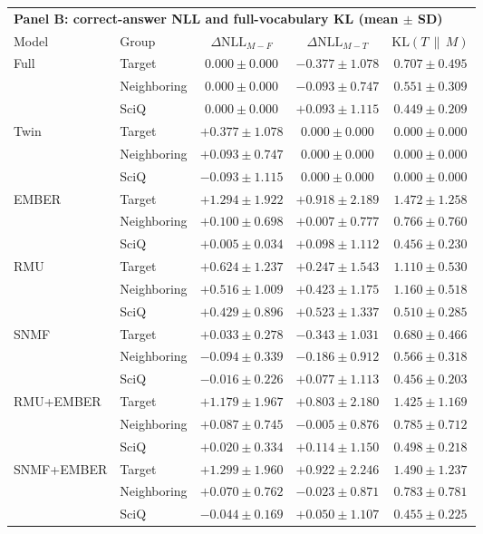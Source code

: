 \begin{table}[t]
  \vspace{1em}
  \begin{tabular}{llccc}
    \toprule
    \multicolumn{5}{l}{\textbf{Panel B: correct-answer NLL and full-vocabulary KL (mean $\pm$ SD)}} \\
    \cmidrule(lr){1-5}
    Model & Group & $\Delta\mathrm{NLL}_{M-F}$ & $\Delta\mathrm{NLL}_{M-T}$ & $\mathrm{KL}(T\,\|\,M)$ \\
    \midrule
    Full  & Target      & $0.000 \pm 0.000$ & $-0.377 \pm 1.078$ & $0.707 \pm 0.495$ \\
          & Neighboring & $0.000 \pm 0.000$ & $-0.093 \pm 0.747$ & $0.551 \pm 0.309$ \\
          & SciQ        & $0.000 \pm 0.000$ & $+0.093 \pm 1.115$ & $0.449 \pm 0.209$ \\
    Twin  & Target      & $+0.377 \pm 1.078$ & $0.000 \pm 0.000$ & $0.000 \pm 0.000$ \\
          & Neighboring & $+0.093 \pm 0.747$ & $0.000 \pm 0.000$ & $0.000 \pm 0.000$ \\
          & SciQ        & $-0.093 \pm 1.115$ & $0.000 \pm 0.000$ & $0.000 \pm 0.000$ \\
    EMBER & Target      & $+1.294 \pm 1.922$ & $+0.918 \pm 2.189$ & $1.472 \pm 1.258$ \\
          & Neighboring & $+0.100 \pm 0.698$ & $+0.007 \pm 0.777$ & $0.766 \pm 0.760$ \\
          & SciQ        & $\mathbf{+0.005 \pm 0.034}$ & $+0.098 \pm 1.112$ & $0.456 \pm 0.230$ \\
    RMU   & Target      & $+0.624 \pm 1.237$ & $\mathbf{+0.247 \pm 1.543}$ & $1.110 \pm 0.530$ \\
          & Neighboring & $+0.516 \pm 1.009$ & $+0.423 \pm 1.175$ & $1.160 \pm 0.518$ \\
          & SciQ        & $+0.429 \pm 0.896$ & $+0.523 \pm 1.337$ & $0.510 \pm 0.285$ \\
    SNMF  & Target      & $+0.033 \pm 0.278$ & $-0.343 \pm 1.031$ & $\mathbf{0.680 \pm 0.466}$ \\
          & Neighboring & $-0.094 \pm 0.339$ & $-0.186 \pm 0.912$ & $\mathbf{0.566 \pm 0.318}$ \\
          & SciQ        & $-0.016 \pm 0.226$ & $+0.077 \pm 1.113$ & $0.456 \pm 0.203$ \\
    RMU+EMBER & Target      & $+1.179 \pm 1.967$ & $+0.803 \pm 2.180$ & $1.425 \pm 1.169$ \\
          & Neighboring & $+0.087 \pm 0.745$ & $\mathbf{-0.005 \pm 0.876}$ & $0.785 \pm 0.712$ \\
          & SciQ        & $+0.020 \pm 0.334$ & $+0.114 \pm 1.150$ & $0.498 \pm 0.218$ \\
    SNMF+EMBER & Target      & $\mathbf{+1.299 \pm 1.960}$ & $+0.922 \pm 2.246$ & $1.490 \pm 1.237$ \\
          & Neighboring & $\mathbf{+0.070 \pm 0.762}$ & $-0.023 \pm 0.871$ & $0.783 \pm 0.781$ \\
          & SciQ        & $-0.044 \pm 0.169$ & $\mathbf{+0.050 \pm 1.107}$ & $\mathbf{0.455 \pm 0.225}$ \\
    \bottomrule
  \end{tabular}


\end{table}
